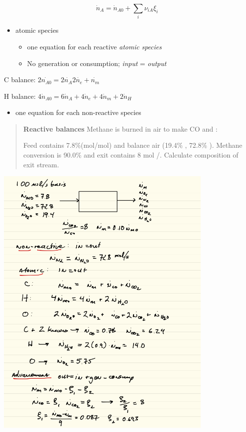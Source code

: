 \documentclass[11pt]{article}
\begin{document}
\[\dot{n}_{A} = \dot{n}_{A0} + \sum_{i}\nu_{iA}\xi_{i}\]

\begin{itemize}
\item atomic species
\begin{itemize}
\item one equation for each reactive \emph{atomic species}
\item No generation or consumption;  \emph{input} = \emph{output}
\end{itemize}
\end{itemize}

C balance: \(2 \dot{n_{A0}} = 2 \dot{n_{A}} 2 \dot{n_{e}} + \dot{n_{m}}\)

H balance: \(4 \dot{n}_{A0} = 6\dot{n}_{A} + 4\dot{n}_{e} + 4\dot{n}_{m} + 2\dot{n}_{H} \)

\begin{itemize}
\item one equation for each non-reactive species
\end{itemize}

\begin{quote}
\hline
\textbf{Reactive balances}  Methane is burned in air to make CO and :
\begin{center}

\end{center}
Feed contains 7.8\%(mol/mol)  and balance air (19.4\% , 72.8\% ).  Methane conversion is 90.0\% and exit contains 8 mol /.  Calculate composition of exit stream.
\hline
\end{quote}

\includegraphics[width=0.8\textwidth]{./figs/Reactive.png}
\end{document}
